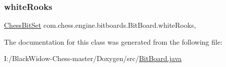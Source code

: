 \mbox{\label{classcom_1_1chess_1_1engine_1_1bitboards_1_1_bit_board_a296b28529366f3f5db38f17b5a892986}} 
\subsubsection{\texorpdfstring{whiteRooks}{whiteRooks}}
{\footnotesize\ttfamily \mbox{\hyperlink{classcom_1_1chess_1_1engine_1_1bitboards_1_1_chess_bit_set}{Chess\+Bit\+Set}} com.\+chess.\+engine.\+bitboards.\+Bit\+Board.\+white\+Rooks\hspace{0.3cm}{\ttfamily [static]}, {\ttfamily [private]}}



The documentation for this class was generated from the following file\+:\begin{DoxyCompactItemize}
\item 
I\+:/\+Black\+Widow-\/\+Chess-\/master/\+Doxygen/src/\mbox{\hyperlink{_bit_board_8java}{Bit\+Board.\+java}}\end{DoxyCompactItemize}
